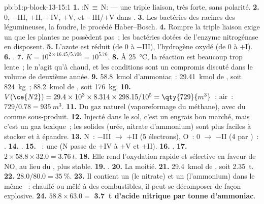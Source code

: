 \begin{solution}{pb:b1:p-block-13-15:1}
\textbf{1.} :N\,$\equiv$\,N: --- une triple liaison, très forte, sans
polarité.
\textbf{2.} 0, $-$III, $+$II, $+$IV, $+$V, et $-$III/$+$V dans .
\textbf{3.} Les bactéries des racines des légumineuses, la foudre, le
procédé Haber--Bosch.
\textbf{4.} Rompre la triple liaison exige un  que les plantes
ne possèdent pas~; les bactéries dotées de l'enzyme nitrogénase en
disposent.
\textbf{5.} L'azote est réduit (de 0 à $-$III), l'hydrogène oxydé (de 0
à $+$I).
\textbf{6.} .
\textbf{7.} $K = 10^{2 \times 16.45/5.708} = 10^{5.76}$.
\textbf{8.} À \qty{25}{\celsius}, la réaction est beaucoup trop lente~;
le  n'agit qu'à chaud, et les conditions sont un compromis
discuté dans le volume de deuxième année.
\textbf{9.} \qty{58.8}{kmol} d'ammoniac~: \qty{29.41}{kmol} de ,
soit \qty{824}{kg}~; \qty{88.2}{kmol} de , soit \qty{176}{kg}.
\textbf{10.} $V(\ce{N2}) = 29.4 \times 10^3 \times 8.314 \times 298.15/10^5 =
\qty{729}{m^3}$~; air~: $729/0.78 = \qty{935}{m^3}$.
\textbf{11.} Du gaz naturel (vaporeformage du méthane), avec du 
comme sous-produit.
\textbf{12.} Injecté dans le sol, c'est un engrais bon marché, mais c'est
un gaz toxique~; les solides (urée, nitrate d'ammonium) sont plus faciles
à stocker et à épandre.
\textbf{13.} N~: $-$III $\to$ $+$II (5 électrons), O~: 0 $\to$ $-$II (4 par
)~: .
\textbf{14.} .
\textbf{15.} ~: une  (N passe de
$+$IV à
$+$V et $+$II).
\textbf{16.} .
\textbf{17.} $2 \times 58.8 \times 32.0 = \qty{3.76}{t}$.
\textbf{18.} Elle rend l'oxydation rapide et sélective en faveur de NO,
au lieu du , plus stable.
\textbf{19.} .
\textbf{20.} La moitié.
\textbf{21.} \qty{29.4}{kmol} de , soit \qty{2.35}{t}.
\textbf{22.} $28.0/80.0 = \qty{35}{\percent}$.
\textbf{23.} Il contient un  (le nitrate) et un 
(l'ammonium) dans le même ~: chauffé ou mêlé à des combustibles,
il peut se décomposer de façon explosive.
\textbf{24.} $58.8 \times 63.0 =$ \textbf{\qty{3.7}{t} d'acide nitrique
par tonne d'ammoniac}.
\end{solution}
